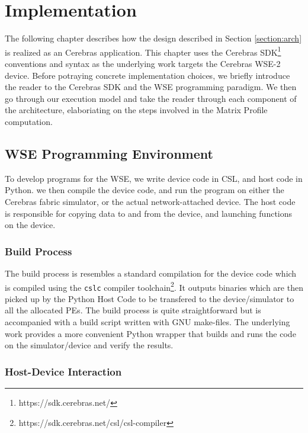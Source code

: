 
\chapter{Implementation}\label{chapter:implementation}

The following chapter describes how the design described in Section \ref{section:arch} is realized as an Cerebras application. This chapter uses the Cerebras SDK\footnote{https://sdk.cerebras.net/} conventions and syntax as the underlying work targets the Cerebras WSE-2 device.
Before potraying concrete implementation choices, we briefly introduce the reader to the Cerebras SDK and the WSE programming paradigm. We then go through our execution model and take the reader through each component of the architecture, elaboriating on the steps involved in the Matrix Profile computation.

\clearpage

\section{WSE Programming Environment} \label{section:wse_programming_env}

To develop programs for the WSE, we write device code in CSL, and host code in Python. we then compile the device code, and run the program on either the Cerebras fabric simulator, or the actual network-attached device. The host code is responsible for copying data to and from the device, and launching functions on the device.

\subsection{Build Process} \label{section:build_process}

The build process is resembles a standard compilation for the device code which is compiled using the \texttt{cslc} compiler toolchain\footnote{https://sdk.cerebras.net/csl/csl-compiler}. It outputs binaries which are then picked up by the Python Host Code to be transfered to the device/simulator to all the allocated PEs. The build process is quite straightforward but is accompanied with a build script written with GNU make-files. The underlying work provides a more convenient Python wrapper that builds and runs the code on the simulator/device and verify the results.

\subsection{Host-Device Interaction} \label{section:host_device}

